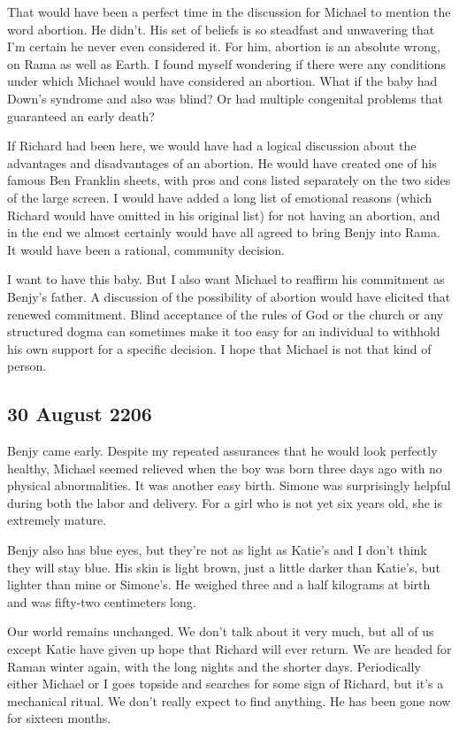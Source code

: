\documentclass[]{article}
\begin{document}
That would have been a perfect time in the discussion for Michael to mention the word abortion.  He didn’t.  His set of beliefs is so steadfast and unwavering that I’m certain he never even considered it.  For him, abortion is an absolute wrong, on Rama as well as Earth.  I found myself wondering if there were any conditions under which Michael would have considered an abortion.  What if the baby had Down’s syndrome and also was blind? Or had multiple congenital problems that guaranteed an early death?

If Richard had been here, we would have had a logical discussion about the advantages and disadvantages of an abortion.  He would have created one of his famous Ben Franklin sheets, with pros and cons listed separately on the two sides of the large screen.  I would have added a long list of emotional reasons (which Richard would have omitted in his original list) for not having an abortion, and in the end we almost certainly would have all agreed to bring Benjy into Rama.  It would have been a rational, community decision.

I want to have this baby.  But I also want Michael to reaffirm his commitment as Benjy’s father.  A discussion of the possibility of abortion would have elicited that renewed commitment.  Blind acceptance of the rules of God or the church or any structured dogma can sometimes make it too easy for an individual to withhold his own support for a specific decision.  I hope that Michael is not that kind of person.

\subsection*{30 August 2206}

Benjy came early.  Despite my repeated assurances that he would look perfectly healthy, Michael seemed relieved when the boy was born three days ago with no physical abnormalities.  It was another easy birth.  Simone was surprisingly helpful during both the labor and delivery.  For a girl who is not yet six years old, she is extremely mature.

Benjy also has blue eyes, but they’re not as light as Katie’s and I don’t think they will stay blue.  His skin is light brown, just a little darker than Katie’s, but lighter than mine or Simone’s.  He weighed three and a half kilograms at birth and was fifty-two centimeters long.

Our world remains unchanged.  We don’t talk about it very much, but all of us except Katie have given up hope that Richard will ever return.  We are headed for Raman winter again, with the long nights and the shorter days.  Periodically either Michael or I goes topside and searches for some sign of Richard, but it’s a mechanical ritual.  We don’t really expect to find anything.  He has been gone now for sixteen months.
\end{document}
